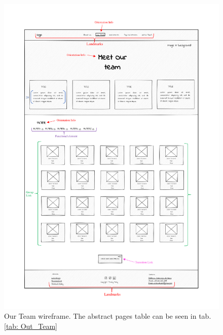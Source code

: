 \begin{figure}
    \centering
    \includegraphics[width=\textwidth]{Images/Wireframes/Our Team_wireframe.pdf}
    \caption{Our Team wireframe. The abstract pages table can be seen in tab. \ref{tab: Out_Team}}
    \label{fig: OurTeamWireframe}
\end{figure}

